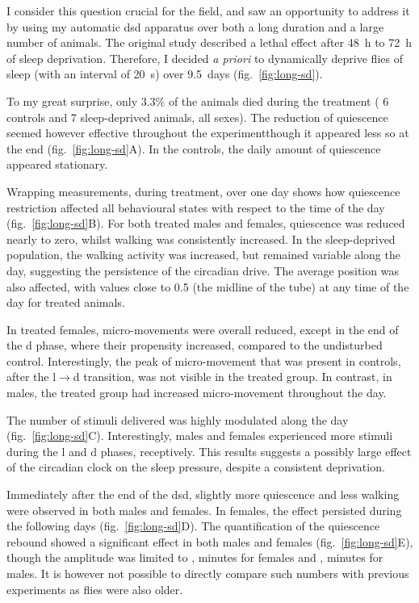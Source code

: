 I consider this question crucial for the field, 
and saw an opportunity to address it by using my automatic \gls{dsd} apparatus over both a long duration and a large number of animals. 
The original study described a lethal effect after 48~h to 72~h of sleep deprivation\cite{shaw_stress_2002}.
Therefore, I decided \emph{a priori} to dynamically deprive flies of sleep (with an interval of 20~s) over 9.5~days
(fig.~\ref{fig:long-sd}).



To my great surprise, only 3.3\% of the animals died during the treatment (\ie{} 6 controls and 7 sleep-deprived animals, all sexes).
The reduction of quiescence seemed however effective throughout the experiment\emd{}though it appeared less so at the end (fig.~\ref{fig:long-sd}A).
In the controls, the daily amount of quiescence appeared stationary.

Wrapping measurements, during treatment, over one day shows how quiescence restriction affected all behavioural 
states with respect to the time of the day (fig.~\ref{fig:long-sd}B).
For both treated males and females, quiescence was reduced nearly to zero, whilst walking was consistently increased. 
In the sleep-deprived population, the walking activity was increased, but remained variable along the day, suggesting the persistence of the circadian drive.
The average position was also affected, with values close to 0.5 (the midline of the tube) at any time of the day for treated animals.

In treated females, micro-movements were overall reduced, except in the end of the \gls{d} phase, where their propensity increased, compared to the undisturbed control.
Interestingly, the peak of micro-movement that was present in controls, after the \gls{l}$\rightarrow$\gls{d} transition, was not visible in the treated group.
In contrast, in males, the treated group had increased micro-movement throughout the day.


The number of stimuli delivered was highly modulated along the day (fig.~\ref{fig:long-sd}C).
Interestingly, males and females experienced more stimuli during the \gls{l} and \gls{d} phases, receptively.
This results suggests a possibly large effect of the circadian clock on the sleep pressure, despite a consistent deprivation.

Immediately after the end of the \gls{dsd}, slightly more quiescence and less walking were observed in both males and females.
In females, the effect persisted during the following days (fig.~\ref{fig:long-sd}D).
The quantification of the quiescence rebound showed a significant effect in both males and females (fig.~\ref{fig:long-sd}E), though the amplitude was limited to 
, minutes for females and 
, minutes for males.
It is however not possible to directly compare such numbers with previous experiments as flies were also older.


